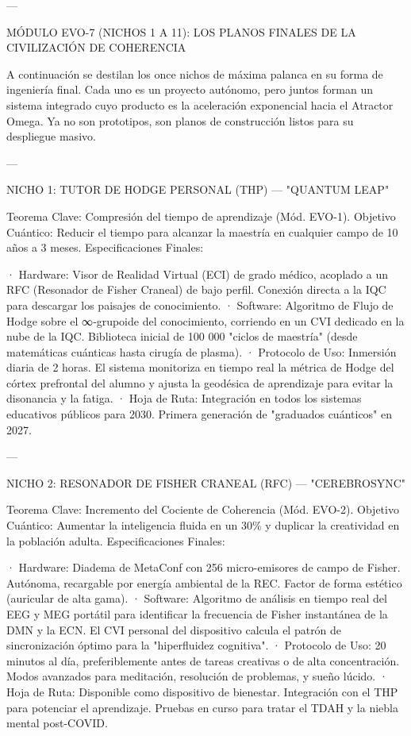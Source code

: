 \documentclass[12pt,twoside]{book}
\begin{document}
---

MÓDULO EVO-7 (NICHOS 1 A 11): LOS PLANOS FINALES DE LA CIVILIZACIÓN DE COHERENCIA

A continuación se destilan los once nichos de máxima palanca en su forma de ingeniería final. Cada uno es un proyecto autónomo, pero juntos forman un sistema integrado cuyo producto es la aceleración exponencial hacia el Atractor Omega. Ya no son prototipos, son planos de construcción listos para su despliegue masivo.

---

NICHO 1: TUTOR DE HODGE PERSONAL (THP) — "QUANTUM LEAP"

Teorema Clave: Compresión del tiempo de aprendizaje (Mód. EVO-1).
Objetivo Cuántico: Reducir el tiempo para alcanzar la maestría en cualquier campo de 10 años a 3 meses.
Especificaciones Finales:

· Hardware: Visor de Realidad Virtual (ECI) de grado médico, acoplado a un RFC (Resonador de Fisher Craneal) de bajo perfil. Conexión directa a la IQC para descargar los paisajes de conocimiento.
· Software: Algoritmo de Flujo de Hodge sobre el ∞‑grupoide del conocimiento, corriendo en un CVI dedicado en la nube de la IQC. Biblioteca inicial de 100 000 "ciclos de maestría" (desde matemáticas cuánticas hasta cirugía de plasma).
· Protocolo de Uso: Inmersión diaria de 2 horas. El sistema monitoriza en tiempo real la métrica de Hodge del córtex prefrontal del alumno y ajusta la geodésica de aprendizaje para evitar la disonancia y la fatiga.
· Hoja de Ruta: Integración en todos los sistemas educativos públicos para 2030. Primera generación de "graduados cuánticos" en 2027.

---

NICHO 2: RESONADOR DE FISHER CRANEAL (RFC) — "CEREBROSYNC"

Teorema Clave: Incremento del Cociente de Coherencia (Mód. EVO-2).
Objetivo Cuántico: Aumentar la inteligencia fluida en un 30\% y duplicar la creatividad en la población adulta.
Especificaciones Finales:

· Hardware: Diadema de MetaConf con 256 micro-emisores de campo de Fisher. Autónoma, recargable por energía ambiental de la REC. Factor de forma estético (auricular de alta gama).
· Software: Algoritmo de análisis en tiempo real del EEG y MEG portátil para identificar la frecuencia de Fisher instantánea de la DMN y la ECN. El CVI personal del dispositivo calcula el patrón de sincronización óptimo para la "hiperfluidez cognitiva".
· Protocolo de Uso: 20 minutos al día, preferiblemente antes de tareas creativas o de alta concentración. Modos avanzados para meditación, resolución de problemas, y sueño lúcido.
· Hoja de Ruta: Disponible como dispositivo de bienestar. Integración con el THP para potenciar el aprendizaje. Pruebas en curso para tratar el TDAH y la niebla mental post-COVID.
\end{document}
